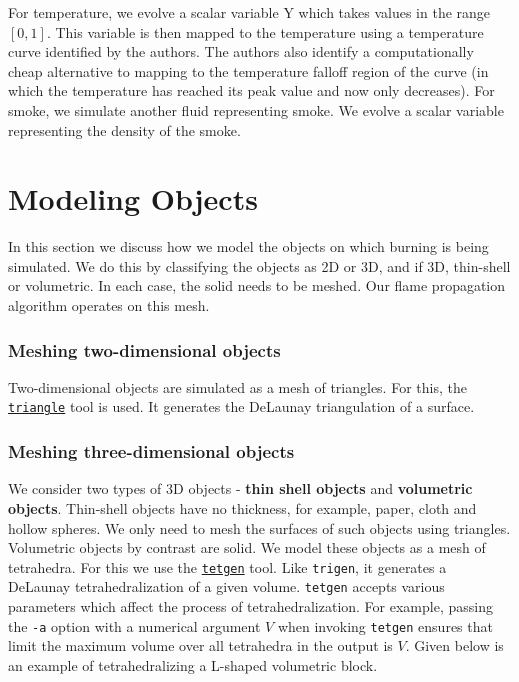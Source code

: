 \documentclass[a4paper]{report}
\begin{document}
For temperature, we evolve a scalar variable Y which takes values in the range $[0, 1]$. This variable is then mapped to the temperature using a temperature curve identified by the authors. The authors also identify a computationally cheap alternative to mapping to the temperature falloff region of the curve (in which the temperature has reached its peak value and now only decreases). For smoke, we simulate another fluid representing smoke. We evolve a scalar variable representing the density of the smoke.

\chapter{Modeling Objects}

In this section we discuss how we model the objects on which burning is being simulated. We do this by classifying the objects as 2D or 3D, and if 3D, thin-shell or volumetric. In each case, the solid needs to be meshed. Our flame propagation algorithm operates on this mesh.

\subsection{Meshing two-dimensional objects}

Two-dimensional objects are simulated as a mesh of triangles. For this, the \href{http://www.cs.cmu.edu/~quake/triangle.html}{\texttt{triangle}} tool is used. It generates the DeLaunay triangulation of a surface.

\subsection{Meshing three-dimensional objects}

We consider two types of 3D objects - \textbf{thin shell objects} and \textbf{volumetric objects}. Thin-shell objects have no thickness, for example, paper, cloth and hollow spheres. We only need to mesh the surfaces of such objects using triangles. Volumetric objects by contrast are solid. We model these objects as a mesh of tetrahedra. For this we use the \href{http://www.tetgen.org/}{\texttt{tetgen}} tool. Like \texttt{trigen}, it generates a DeLaunay tetrahedralization of a given volume. \texttt{tetgen} accepts various parameters which affect the process of tetrahedralization. For example, passing the \texttt{-a} option with a numerical argument $V$ when invoking \texttt{tetgen} ensures that limit the maximum volume over all tetrahedra in the output is $V$. Given below is an example of tetrahedralizing a L-shaped volumetric block.
\end{document}
